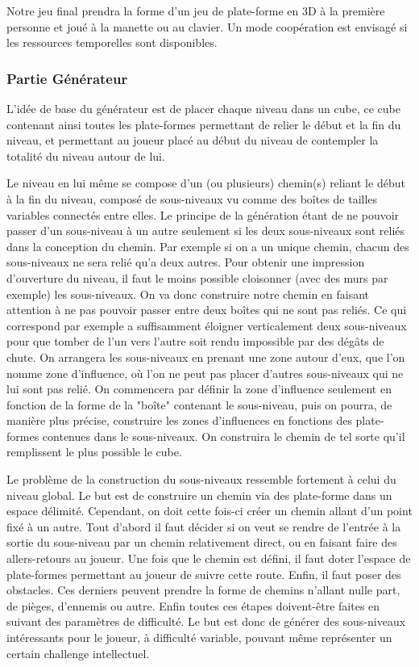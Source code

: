 \documentclass[12pt]{article}
\begin{document}
            Notre jeu final prendra la forme d'un jeu de plate-forme en 3D à la première personne et joué à la manette ou au clavier. Un mode coopération est envisagé si les ressources temporelles sont disponibles.
            
        \subsubsection{Partie Générateur}
            L'idée de base du générateur est de placer chaque niveau dans un cube, ce cube contenant ainsi toutes les plate-formes permettant de relier le début et la fin du niveau, et permettant au joueur placé au début du niveau de contempler la totalité du niveau autour de lui. 

            Le niveau en lui même se compose d'un (ou plusieurs) chemin(s) reliant le début à la fin du niveau, composé de sous-niveaux vu comme des boîtes de tailles variables connectés entre elles. Le principe de la génération étant de ne pouvoir passer d'un sous-niveau à un autre seulement si les deux sous-niveaux sont reliés dans la conception du chemin. Par exemple si on a un unique chemin, chacun des sous-niveaux ne sera relié qu'a deux autres. Pour obtenir une impression d'ouverture du niveau, il faut le moins possible cloisonner (avec des murs par exemple) les sous-niveaux. On va donc construire notre chemin en faisant attention à ne pas pouvoir passer entre deux boîtes qui ne sont pas reliés. Ce qui correspond par exemple a suffisamment éloigner verticalement deux sous-niveaux pour que tomber de l'un vers l'autre soit rendu impossible par des dégâts de chute. On arrangera les sous-niveaux en prenant une zone autour d'eux, que l'on nomme zone d'influence, où l'on ne peut pas placer d'autres sous-niveaux qui ne lui sont pas relié. On commencera par définir la zone d'influence seulement en fonction de la forme de la "boîte" contenant le sous-niveau, puis on pourra, de manière plus précise, construire les zones d'influences en fonctions des plate-formes contenues dans le sous-niveaux. On construira le chemin de tel sorte qu'il remplissent le plus possible le cube.

            Le problème de la construction du sous-niveaux ressemble fortement à celui du niveau global. Le but est de construire un chemin via des plate-forme dans un espace délimité. Cependant, on doit cette fois-ci créer un chemin allant d'un point fixé à un autre.­
            Tout d'abord il faut décider si on veut se rendre de l'entrée à la sortie du sous-niveau par un chemin relativement direct, ou en faisant faire des allers-retours au joueur. Une fois que le chemin est défini, il faut doter l'espace de plate-formes permettant au joueur de suivre cette route. Enfin, il faut poser des obstacles. Ces derniers peuvent prendre la forme de chemins n'allant nulle part, de pièges, d'ennemis ou autre.
            Enfin toutes ces étapes doivent-être faites en suivant des paramètres de difficulté.
            Le but est donc de générer des sous-niveaux intéressants pour le joueur, à difficulté variable, pouvant même représenter un certain challenge intellectuel.
\end{document}
